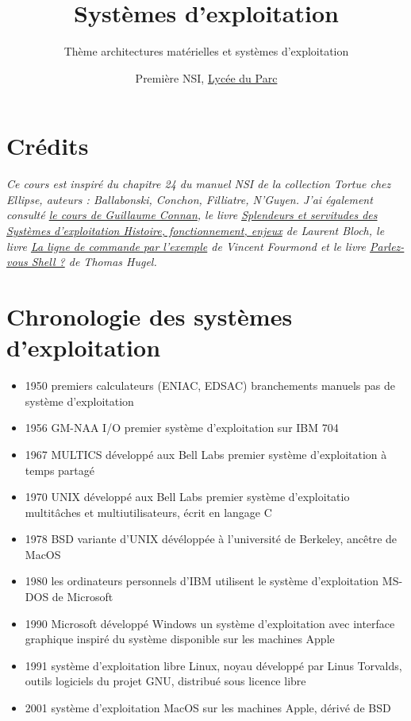 \documentclass[
  11pt,
]{article}
\title{Systèmes d'exploitation}
\subtitle{Thème architectures matérielles et systèmes d'exploitation}
\author{Première NSI, \href{https://frederic-junier.org/}{Lycée du Parc}}
\date{}
\newcounter{cours}
\newcounter{logi}
\begin{document}
\maketitle

\renewcommand*\contentsname{Table des matières}
{
\hypersetup{linkcolor=}
\setcounter{tocdepth}{3}
\tableofcontents
}
\hypertarget{cruxe9dits}{%
\section*{Crédits}\label{cruxe9dits}}

\emph{Ce cours est inspiré du chapitre 24 du manuel NSI de la collection
Tortue chez Ellipse, auteurs : Ballabonski, Conchon, Filliatre, N'Guyen.
J'ai également consulté
\href{https://gitlab.com/lyceeND/1ere/-/blob/master/2019_20/2_Systeme_1/systeme19.md}{le
cours de Guillaume Connan}, le livre
\href{https://laurentbloch.net/MySpip3/IMG/pdf/histsys-screen-20200727.pdf}{Splendeurs
et servitudes des Systèmes d'exploitation Histoire, fonctionnement,
enjeux} de Laurent Bloch, le livre
\href{https://www.eyrolles.com/Informatique/Livre/la-ligne-de-commande-par-l-exemple-9782351410721/}{La
ligne de commande par l'exemple} de Vincent Fourmond et le livre
\href{https://www.eyrolles.com/Informatique/Livre/parlez-vous-shell--9782729877590/}{Parlez-vous
Shell ?} de Thomas Hugel.}

\hypertarget{chronologie-des-systuxe8mes-dexploitation}{%
\section{Chronologie des systèmes
d'exploitation}\label{chronologie-des-systuxe8mes-dexploitation}}

\begin{itemize}
\item
  1950 premiers calculateurs (ENIAC, EDSAC) branchements manuels pas de
  système d'exploitation
\item
  1956 GM-NAA I/O premier système d'exploitation sur IBM 704
\item
  1967 MULTICS développé aux Bell Labs premier système d'exploitation à
  temps partagé
\item
  1970 UNIX développé aux Bell Labs premier système d'exploitatio
  multitâches et multiutilisateurs, écrit en langage C
\item
  1978 BSD variante d'UNIX dévéloppée à l'université de Berkeley,
  ancêtre de MacOS
\item
  1980 les ordinateurs personnels d'IBM utilisent le système
  d'exploitation MS-DOS de Microsoft
\item
  1990 Microsoft développé Windows un système d'exploitation avec
  interface graphique inspiré du système disponible sur les machines
  Apple
\item
  1991 système d'exploitation libre Linux, noyau développé par Linus
  Torvalds, outils logiciels du projet GNU, distribué sous licence libre
\item
  2001 système d'exploitation MacOS sur les machines Apple, dérivé de
  BSD
\end{itemize}
\end{document}
